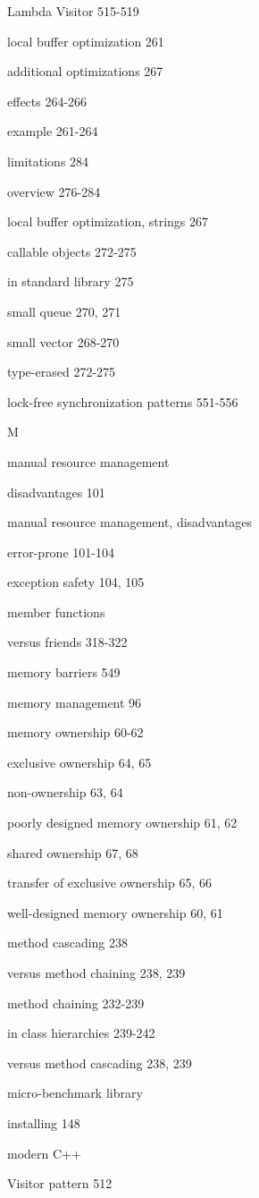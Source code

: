Lambda Visitor 515-519

local buffer optimization 261

additional optimizations 267

effects 264-266

example 261-264

limitations 284

overview 276-284

local buffer optimization, strings 267

callable objects 272-275

in standard library 275

small queue 270, 271

small vector 268-270

type-erased 272-275

lock-free synchronization patterns 551-556

M

manual resource management

disadvantages 101

manual resource management, disadvantages

error-prone 101-104

exception safety 104, 105

member functions

versus friends 318-322

memory barriers 549

memory management 96

memory ownership 60-62

exclusive ownership 64, 65

non-ownership 63, 64

poorly designed memory ownership 61, 62

shared ownership 67, 68

transfer of exclusive ownership 65, 66

well-designed memory ownership 60, 61

method cascading 238

versus method chaining 238, 239

method chaining 232-239

in class hierarchies 239-242

versus method cascading 238, 239

micro-benchmark library

installing 148

modern C++

Visitor pattern 512

